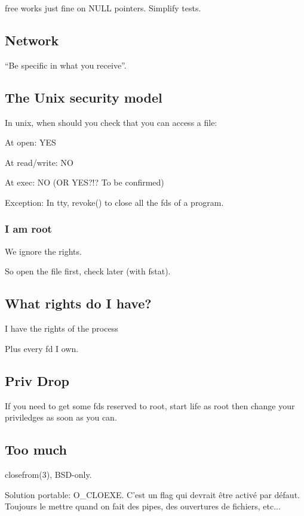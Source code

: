 \documentclass[a4paper,11pt]{article}
\begin{document}
free works just fine on NULL pointers. Simplify tests.

\subsection{Network}

``Be specific in what you receive''.

\subsection{The Unix security model}

In unix, when should you check that you can access a file:

At open: YES

At read/write: NO

At exec: NO (OR YES?!? To be confirmed)

Exception: In tty, revoke() to close all the fds of a program.

\subsubsection{I am root}

We ignore the rights.

So open the file first, check later (with fstat).

\subsection{What rights do I have?}

I have the rights of the process

Plus every fd I own.

\subsection{Priv Drop}

If you need to get some fds reserved to root, start life as root then
change your priviledges as soon as you can.

\subsection{Too much}

closefrom(3), BSD-only.

Solution portable: O\_CLOEXE. C'est un flag qui devrait être activé par défaut.
Toujours le mettre quand on fait des pipes, des ouvertures de fichiers, etc...
\end{document}
